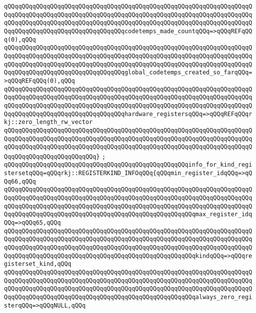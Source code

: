 \verb|qQQqqQQqqQQqqQQqqQQqqQQqqQQqqQQqqQQqqQQqqQQqqQQqqQQqqQQqqQQqqQQqqQQqqQQqqQQqqQQqqQQqqQQqqQQqqQQqqQQqqQQqqQQqqQQqqQQqqQQqqQQqqQQqqQQqqQQqqQQqqQQqqQQqqQQqqQQqqQQqqQQqqQQqqQQqqQQqqQQqqQQqqQQqqQQqqQQqqQQqqQQqqQQqqQQqqQQqqQQqqQQqqQQqqQQqqQQqqQQqqQQqcodetemps_made_countqQQq=>qQQqREFqQQq(0),qQQq|\newline
\verb|qQQqqQQqqQQqqQQqqQQqqQQqqQQqqQQqqQQqqQQqqQQqqQQqqQQqqQQqqQQqqQQqqQQqqQQqqQQqqQQqqQQqqQQqqQQqqQQqqQQqqQQqqQQqqQQqqQQqqQQqqQQqqQQqqQQqqQQqqQQqqQQqqQQqqQQqqQQqqQQqqQQqqQQqqQQqqQQqqQQqqQQqqQQqqQQqqQQqqQQqqQQqqQQqqQQqqQQqqQQqqQQqqQQqqQQqqQQqqQQqqQQqglobal_codetemps_created_so_farqQQq=>qQQqREFqQQq(0),qQQq|\newline
\verb|qQQqqQQqqQQqqQQqqQQqqQQqqQQqqQQqqQQqqQQqqQQqqQQqqQQqqQQqqQQqqQQqqQQqqQQqqQQqqQQqqQQqqQQqqQQqqQQqqQQqqQQqqQQqqQQqqQQqqQQqqQQqqQQqqQQqqQQqqQQqqQQqqQQqqQQqqQQqqQQqqQQqqQQqqQQqqQQqqQQqqQQqqQQqqQQqqQQqqQQqqQQqqQQqqQQqqQQqqQQqqQQqqQQqqQQqqQQqqQQqqQQqhardware_registersqQQq=>qQQqREFqQQqrkj::zero_length_rw_vector|\newline
\verb|qQQqqQQqqQQqqQQqqQQqqQQqqQQqqQQqqQQqqQQqqQQqqQQqqQQqqQQqqQQqqQQqqQQqqQQqqQQqqQQqqQQqqQQqqQQqqQQqqQQqqQQqqQQqqQQqqQQqqQQqqQQqqQQqqQQqqQQqqQQqqQQqqQQqqQQqqQQqqQQqqQQqqQQqqQQqqQQqqQQqqQQqqQQqqQQqqQQqqQQqqQQqqQQqqQQqqQQqqQQqqQQqqQQqqQQqqQQq}|\newline
\verb|;|\newline
\verb|qQQqqQQqqQQqqQQqqQQqqQQqqQQqqQQqqQQqqQQqqQQqqQQqqQQqinfo_for_kind_registersetqQQq=qQQqrkj::REGISTERKIND_INFOqQQq{qQQqmin_register_idqQQq=>qQQq66,qQQq|\newline
\verb|qQQqqQQqqQQqqQQqqQQqqQQqqQQqqQQqqQQqqQQqqQQqqQQqqQQqqQQqqQQqqQQqqQQqqQQqqQQqqQQqqQQqqQQqqQQqqQQqqQQqqQQqqQQqqQQqqQQqqQQqqQQqqQQqqQQqqQQqqQQqqQQqqQQqqQQqqQQqqQQqqQQqqQQqqQQqqQQqqQQqqQQqqQQqqQQqqQQqqQQqqQQqqQQqqQQqqQQqqQQqqQQqqQQqqQQqqQQqqQQqqQQqqQQqqQQqqQQqqQQqqQQqmax_register_idqQQq=>qQQq65,qQQq|\newline
\verb|qQQqqQQqqQQqqQQqqQQqqQQqqQQqqQQqqQQqqQQqqQQqqQQqqQQqqQQqqQQqqQQqqQQqqQQqqQQqqQQqqQQqqQQqqQQqqQQqqQQqqQQqqQQqqQQqqQQqqQQqqQQqqQQqqQQqqQQqqQQqqQQqqQQqqQQqqQQqqQQqqQQqqQQqqQQqqQQqqQQqqQQqqQQqqQQqqQQqqQQqqQQqqQQqqQQqqQQqqQQqqQQqqQQqqQQqqQQqqQQqqQQqqQQqqQQqqQQqqQQqqQQqkindqQQq=>qQQqregisterset_kind,qQQq|\newline
\verb|qQQqqQQqqQQqqQQqqQQqqQQqqQQqqQQqqQQqqQQqqQQqqQQqqQQqqQQqqQQqqQQqqQQqqQQqqQQqqQQqqQQqqQQqqQQqqQQqqQQqqQQqqQQqqQQqqQQqqQQqqQQqqQQqqQQqqQQqqQQqqQQqqQQqqQQqqQQqqQQqqQQqqQQqqQQqqQQqqQQqqQQqqQQqqQQqqQQqqQQqqQQqqQQqqQQqqQQqqQQqqQQqqQQqqQQqqQQqqQQqqQQqqQQqqQQqqQQqqQQqqQQqalways_zero_registerqQQq=>qQQqNULL,qQQq|\newline

